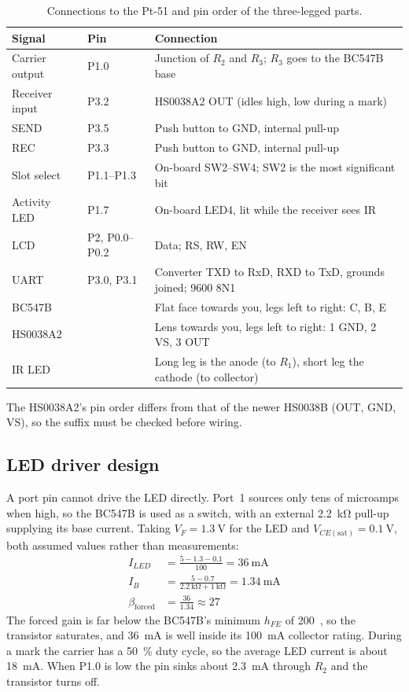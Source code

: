 \documentclass[11pt,a4paper]{article}
\begin{document}
\begin{table}[H]
\centering
\caption{Connections to the Pt-51 and pin order of the three-legged parts.}
\label{tab:wires}
\begin{tabularx}{\textwidth}{llL}
\toprule
Signal & Pin & Connection\\
\midrule
Carrier output & P1.0 & Junction of $R_2$ and $R_3$; $R_3$ goes to the BC547B base\\
Receiver input & P3.2 & HS0038A2 OUT (idles high, low during a mark)\\
SEND & P3.5 & Push button to GND, internal pull-up\\
REC & P3.3 & Push button to GND, internal pull-up\\
Slot select & P1.1--P1.3 & On-board SW2--SW4; SW2 is the most significant bit\\
Activity LED & P1.7 & On-board LED4, lit while the receiver sees IR\\
LCD & P2, P0.0--P0.2 & Data; RS, RW, EN\\
UART & P3.0, P3.1 & Converter TXD to RxD, RXD to TxD, grounds joined; 9600 8N1\\
\midrule
BC547B & & Flat face towards you, legs left to right: C, B, E\\
HS0038A2 & & Lens towards you, legs left to right: 1 GND, 2 VS, 3 OUT\\
IR LED & & Long leg is the anode (to $R_1$), short leg the cathode (to collector)\\
\bottomrule
\end{tabularx}
\end{table}

The HS0038A2's pin order differs from that of the newer HS0038B (OUT, GND, VS), so the suffix must be checked before wiring.

\subsection{LED driver design}
\label{sec:driver}

A port pin cannot drive the LED directly. Port~1 sources only tens of microamps when high, so the BC547B is used as a switch, with an external \qty{2.2}{\kilo\ohm} pull-up supplying its base current. Taking $V_F = \qty{1.3}{\volt}$ for the LED and $V_{CE(\mathrm{sat})} = \qty{0.1}{\volt}$, both assumed values rather than measurements:
\begin{align*}
I_{LED} &= \frac{5 - 1.3 - 0.1}{100} = \qty{36}{\milli\ampere} \\[2pt]
I_B &= \frac{5 - 0.7}{\qty{2.2}{\kilo\ohm} + \qty{1}{\kilo\ohm}} = \qty{1.34}{\milli\ampere} \\[2pt]
\beta_{\mathrm{forced}} &= \frac{36}{1.34} \approx 27
\end{align*}
The forced gain is far below the BC547B's minimum $h_{FE}$ of 200~\cite{bc547}, so the transistor saturates, and \qty{36}{\milli\ampere} is well inside its \qty{100}{\milli\ampere} collector rating. During a mark the carrier has a \qty{50}{\percent} duty cycle, so the average LED current is about \qty{18}{\milli\ampere}. When P1.0 is low the pin sinks about \qty{2.3}{\milli\ampere} through $R_2$ and the transistor turns off.
\end{document}
